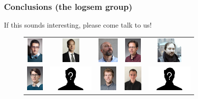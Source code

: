\documentclass[usenames,dvipsnames,aspectratio=169,12pt]{beamer}
\begin{document}
\begin{frame}
  \frametitle{Conclusions (the logsem group)}
  If this sounds interesting, please come talk to us!
  \begin{figure}
    \begin{tabular}{ccccc}
    {\includegraphics[height = 0.5in]{aslan.jpg}}      &
    {\includegraphics[height = 0.5in]{lars.jpg}}       &
    {\includegraphics[height = 0.5in]{bas.jpg}}        &
    {\includegraphics[height = 0.5in]{jaco.jpg}}       &
    {\includegraphics[height = 0.5in]{danil.jpg}}     \\
    {\includegraphics[height = 0.5in]{sabine.jpg}}     &
    {\includegraphics[height = 0.5in]{alix.png}}       &
    {\includegraphics[height = 0.5in]{kristoffer.jpg}} &
    {\includegraphics[height = 0.5in]{johan.jpg}}      &
    {\includegraphics[height = 0.5in]{martin.png}}    \\

\end{tabular}
\end{figure}
\end{frame}
\end{document}
